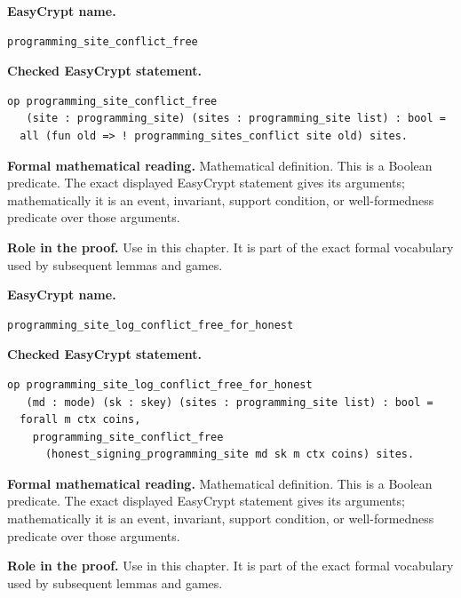 \begin{formaldefinition}
\noindent\textbf{EasyCrypt name.}
\begin{lstlisting}[language=EasyCrypt,basicstyle=\ttfamily\scriptsize]
programming_site_conflict_free
\end{lstlisting}
\noindent\textbf{Checked EasyCrypt statement.}
\begin{lstlisting}[language=EasyCrypt,basicstyle=\ttfamily\scriptsize]
op programming_site_conflict_free
   (site : programming_site) (sites : programming_site list) : bool =
  all (fun old => ! programming_sites_conflict site old) sites.
\end{lstlisting}
\noindent\textbf{Formal mathematical reading.}
Mathematical definition. This is a Boolean predicate.  The exact displayed EasyCrypt statement gives its arguments; mathematically it is an event, invariant, support condition, or well-formedness predicate over those arguments.

\noindent\textbf{Role in the proof.}
Use in this chapter. It is part of the exact formal vocabulary used by subsequent lemmas and games.

\end{formaldefinition}

\begin{formaldefinition}
\noindent\textbf{EasyCrypt name.}
\begin{lstlisting}[language=EasyCrypt,basicstyle=\ttfamily\scriptsize]
programming_site_log_conflict_free_for_honest
\end{lstlisting}
\noindent\textbf{Checked EasyCrypt statement.}
\begin{lstlisting}[language=EasyCrypt,basicstyle=\ttfamily\scriptsize]
op programming_site_log_conflict_free_for_honest
   (md : mode) (sk : skey) (sites : programming_site list) : bool =
  forall m ctx coins,
    programming_site_conflict_free
      (honest_signing_programming_site md sk m ctx coins) sites.
\end{lstlisting}
\noindent\textbf{Formal mathematical reading.}
Mathematical definition. This is a Boolean predicate.  The exact displayed EasyCrypt statement gives its arguments; mathematically it is an event, invariant, support condition, or well-formedness predicate over those arguments.

\noindent\textbf{Role in the proof.}
Use in this chapter. It is part of the exact formal vocabulary used by subsequent lemmas and games.

\end{formaldefinition}

